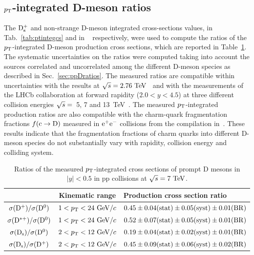 \subsection{$p_{\rm T}$-integrated D-meson ratios}
\label{sec:ppDratiosPtint}
The ${\rm D_s^+}$ and non-strange D-meson integrated cross-sections values,
in Tab.~\ref{tab:ptintegcs} and in ~\cite{Acharya:2017jgo} respectively, 
were used to compute the ratios of the $p_{\rm T}$-integrated D-meson 
production cross sections, which are reported in Table~\ref{tab:ptintegrat}.
The systematic uncertainties on the ratios were computed taking into
account the sources correlated and uncorrelated among the different D-meson
species as described in Sec.~\ref{sec:ppDratios}.
The measured ratios are compatible within uncertainties with the results at
$\sqrt{s}=2.76~\mathrm{TeV}$~\cite{Abelev:2012vra} and with the measurements of
the LHCb collaboration at forward rapidity ($2.0<y<4.5$) at three 
different collision energies $\sqrt{s}=$~5, 7 and 
13~TeV~\cite{Aaij:2013mga,Aaij:2016jht,Aaij:2015bpa}.
The measured $p_{\rm T}$-integrated production ratios are also compatible with the
charm-quark fragmentation fractions $f(\rm c\to D)$ measured in ${\rm e^+e^-}$ 
collisions from the compilation in~\cite{Gladilin:2014tba}.
These results indicate that the fragmentation fractions of charm quarks into
different D-meson species do not substantially vary with rapidity, collision
energy and colliding system.
\begin{table}[!h]
\centering
\begin{tabular}{c|c|l} 
 & Kinematic range & Production cross section ratio \\
\hline
\rule{0pt}{12pt} 
$\sigma({\rm D^+}) / \sigma({\rm D^0})$ & $1<p_{\rm T}<24~\mathrm{GeV}/c$ & $0.45 \pm 0.04 ({\rm stat}) \pm 0.05 ({\rm syst}) \pm 0.01 ({\rm BR})$\\[1ex]
$\sigma({\rm D^{*+}}) / \sigma({\rm D^0})$ & $1<p_{\rm T}<24~\mathrm{GeV}/c$ & $0.52 \pm 0.07 ({\rm stat}) \pm 0.05 ({\rm syst}) \pm 0.01 ({\rm BR})$\\[1ex]
$\sigma({\rm D_s}) / \sigma({\rm D^0})$    & $2<p_{\rm T}<12~\mathrm{GeV}/c$ & $0.19 \pm 0.04 ({\rm stat}) \pm 0.02 ({\rm syst}) \pm 0.01 ({\rm BR})$\\[1ex]
$\sigma({\rm D_s}) / \sigma({\rm D^+})$    & $2<p_{\rm T}<12~\mathrm{GeV}/c$ & $0.45 \pm 0.09 ({\rm stat}) \pm 0.06 ({\rm syst}) \pm 0.02 ({\rm BR})$\\[1ex]
\hline
\end{tabular}
\caption{Ratios of the measured $p_{\rm T}$-integrated cross sections of prompt D mesons in $|y| < 0.5$ in pp collisions at $\sqrt{s} = 7~\mathrm{TeV}$.}
\label{tab:ptintegrat}
\end{table}


